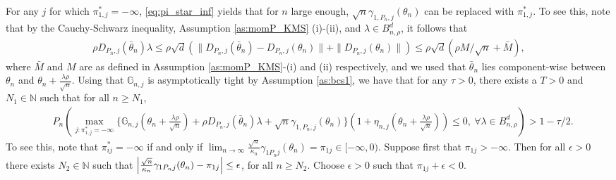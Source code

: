 \documentclass[letterpaper,11pt]{article}
\theoremstyle{myplain}
\theoremstyle{mydefinition}
\theoremstyle{myremark}
\newcommand{\G}{\mathbb{G}}
\newcommand{\N}{\mathbb{N}}
\newcommand{\larhon}{\frac{\lambda \rho }{\sqrt n}}
\newcommand{\tlarhon}{\tfrac{\lambda \rho }{\sqrt n}}
\numberwithin{equation}{section}
\numberwithin{figure}{section}
\begin{document}
\begin{appendices}
 For any $j$ for which $\pi_{1,j}^* = -\infty$, \eqref{eq:pi_star_inf} yields that for $n$ large enough, $\sqrt{n} \gamma_{1,P_n,j}(\theta_n)$ can be replaced with $\pi_{1,j}^*$. To see this, note that by the Cauchy-Schwarz inequality, Assumption \ref{as:momP_KMS} (i)-(ii), and $\lambda\in B^d_{n,\rho}$, it follows that 
\begin{align}
	\rho D_{P_{n},j}(\bar\theta_{n})\lambda \le \rho  \sqrt{d} (\|D_{P_{n},j}(\bar\theta_{n})-D_{P_{n},j}(\theta_{n})\|+\|D_{P_{n},j}(\theta_{n})\|)\le \rho \sqrt{d} (\rho  M/\sqrt n + \bar M),\label{eq:val6}
\end{align}
where $\bar{M}$ and $M$ are as defined in Assumption \ref{as:momP_KMS}-(i) and (ii) respectively, and we used that $\bar{\theta}_{n}$ lies component-wise between $\theta_{n}$ and $\theta_{n}+\larhon$. Using that $\G_{n,j}$ is asymptotically tight by Assumption \ref{as:bcs1}, we have that for any $\tau>0$, there exists a $T>0$ and $N_1\in\mathbb N$ such that for all $n\ge N_1$,
\begin{align}
&P_n \left(\max_{j:\pi^*_{1,j}=-\infty}\{\mathbb G_{n,j}(\theta_n+\tlarhon)+\rho  D_{P_n,j}(\bar\theta_n)\lambda+\sqrt{n} \gamma_{1,P_n,j}(\theta_n)\}(1+\eta_{n,j}(\theta_n+\tlarhon))\le  0 ,~\forall \lambda\in B^d_{n,\rho} \right)>1-\tau/2.\label{eq:pi_star_gamma_vanishes}
\end{align}
To see this, note that $\pi_{ij}^*=-\infty$ if and only if $\lim_{n \to \infty}\frac{\sqrt n}{\kappa_n}\gamma_{1P_nj}(\theta_n)=\pi_{1j}\in [-\infty,0)$. Suppose first that $\pi_{1j}>-\infty$. Then for all $\epsilon>0$ there exists $N_2 \in \N$ such that $
\Bigl\vert \frac{\sqrt n}{\kappa_n}\gamma_{1P_nj}(\theta_n)-\pi_{1j} \Bigr\vert \le \epsilon$, for all $n \ge N_2$. 
Choose $\epsilon>0$ such that $\pi_{1j}+\epsilon <0$. 


\end{appendices}
\end{document}

